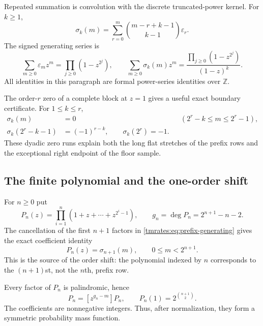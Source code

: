 \documentclass[11pt,oneside]{article}
\theoremstyle{definition}
\theoremstyle{remark}
\newcommand{\Z}{\mathbb Z}
\begin{document}
Repeated summation is convolution with the discrete truncated-power kernel.  For $k\ge1$,
\begin{equation}
 \sigma_k(m)=\sum_{r=0}^{m}\binom{m-r+k-1}{k-1}\varepsilon_r. \label{tmrates:eq:prefix-convolution}
\end{equation}
The signed generating series is
\begin{equation}
 \sum_{m\ge0}\varepsilon_m z^m=\prod_{j\ge0}(1-z^{2^j}),
 \qquad
 \sum_{m\ge0}\sigma_k(m)z^m
 =\frac{\prod_{j\ge0}(1-z^{2^j})}{(1-z)^k}.               \label{tmrates:eq:prefix-generating}
\end{equation}
All identities in this paragraph are formal power-series identities over $\Z$.

The order-$r$ zero of a complete block at $z=1$ gives a useful exact boundary
certificate.  For $1\le k\le r$,
\begin{align}
 \sigma_k(m)&=0 &&(2^r-k\le m\le2^r-1),
 \label{tmrates:eq:zero-run}\\
 \sigma_k(2^r-k-1)&=(-1)^{r-k},\qquad
 \sigma_k(2^r)=-1.
 \label{tmrates:eq:zero-run-boundary}
\end{align}
These dyadic zero runs explain both the long flat stretches of the prefix rows and the
exceptional right endpoint of the floor sample.

\subsection{The finite polynomial and the one-order shift}

For $n\ge0$ put
\begin{equation}
 P_n(z)=\prod_{i=1}^{n}(1+z+\cdots+z^{2^i-1}),
 \qquad
 g_n=\deg P_n=2^{n+1}-n-2.                                \label{tmrates:eq:Pn}
\end{equation}
The cancellation of the first $n+1$ factors in \eqref{tmrates:eq:prefix-generating} gives the exact
coefficient identity
\begin{equation}
 [z^m]P_n(z)=\sigma_{n+1}(m),
 \qquad 0\le m<2^{n+1}.                                   \label{tmrates:eq:coefficient-bridge}
\end{equation}
This is the source of the order shift: the polynomial indexed by $n$ corresponds to the
$(n+1)$st, not the $n$th, prefix row.

Every factor of $P_n$ is palindromic, hence
\begin{equation}
 [z^m]P_n=[z^{g_n-m}]P_n,
 \qquad
 P_n(1)=2^{\binom{n+1}{2}}.                               \label{tmrates:eq:Pn-symmetry-mass}
\end{equation}
The coefficients are nonnegative integers.  Thus, after normalization, they form a symmetric
probability mass function.
\end{document}

